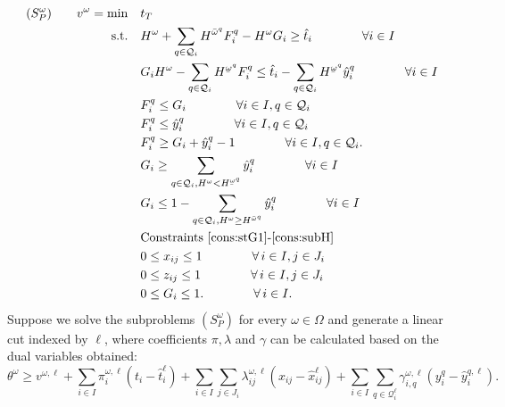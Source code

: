 \documentclass[11pt]{article}
\renewcommand{\underbar}{\underaccent{\bar}}
\begin{document}
	\begin{subequations}
		\label{prob:subTightened}
		\begin{align}
		(S_P^\omega) \qquad v^\omega = \min \quad & t_T \\
		\text{s.t.} \quad & H^\omega + \sum_{q \in \mathcal{Q}_i} H^{\bar{\omega}^q} F_i^q - H^\omega G_i \geq \hat{t}_i \qquad \qquad \forall i \in I \label{cons:sFG1t}\\
		& G_i H^\omega - \sum_{q \in \mathcal{Q}_i} H^{\underbar{\omega}^q} F_i^q \leq \hat{t}_i - \sum_{q \in \mathcal{Q}_i} H^{\underbar{\omega}^q} \hat{y}_i^q \qquad \qquad \forall i \in I \label{cons:sFG2t}\\
		& F_i^q \leq G_i \qquad \qquad \forall i \in I, q \in \mathcal{Q}_i \label{cons:sFGlin1t}\\
		& F_i^q \leq \hat{y}_i^q \qquad \qquad \forall i \in I, q \in \mathcal{Q}_i \label{cons:sFGlin2t}\\
		& F_i^q \geq G_i + \hat{y}_i^q - 1 \qquad \qquad \forall i \in I, q \in \mathcal{Q}_i. \label{cons:sFGlin3t}\\
		& G_i \geq \sum_{q \in \mathcal{Q}_i, H^\omega < H^{\underbar{\omega}^q}} \hat{y}_i^q \qquad \qquad \forall i \in I \label{cons:syG1t}\\
		& G_i \leq 1 - \sum_{q \in \mathcal{Q}_i, H^\omega \geq H^{\bar{\omega}^q}} \hat{y}_i^q \qquad \qquad \forall i \in I \label{cons:syG2t}\\
		& \text{Constraints~\eqref{cons:stG1}-\eqref{cons:subH}}\\
		& 0 \leq x_{ij} \leq 1 \qquad \qquad \forall \,i \in I, j \in J_i\\
		& 0 \leq z_{ij} \leq 1 \qquad \qquad \forall \,i \in I, j \in J_i\\
		& 0 \leq G_i \leq 1. \qquad \qquad \forall \,i \in I. \label{cons:G01t}
		\end{align}
	\end{subequations}
	Suppose we solve the subproblems \((S_P^\omega)\) for every \(\omega \in \Omega\) and generate a linear cut indexed by \(\ell\), where coefficients \(\pi,\lambda\) and \(\gamma\) can be calculated based on the dual variables obtained:
	\begin{equation} \label{cons:cut}
		\theta^\omega \geq v^{\omega,\ell} + \sum_{i \in I} \pi_i^{\omega,\ell} (t_i - \hat{t}_i^{\ell}) + \sum_{i \in I} \sum_{j \in J_i} \lambda_{ij}^{\omega,\ell} (x_{ij} - \hat{x}_{ij}^{\ell}) + \sum_{i \in I} \sum_{q \in \mathcal{Q}^{\ell}_i} \gamma_{i,q}^{\omega,\ell} \left( y_i^{q} - \hat{y}_i^{q,\ell} \right).
	\end{equation}
\end{document}
